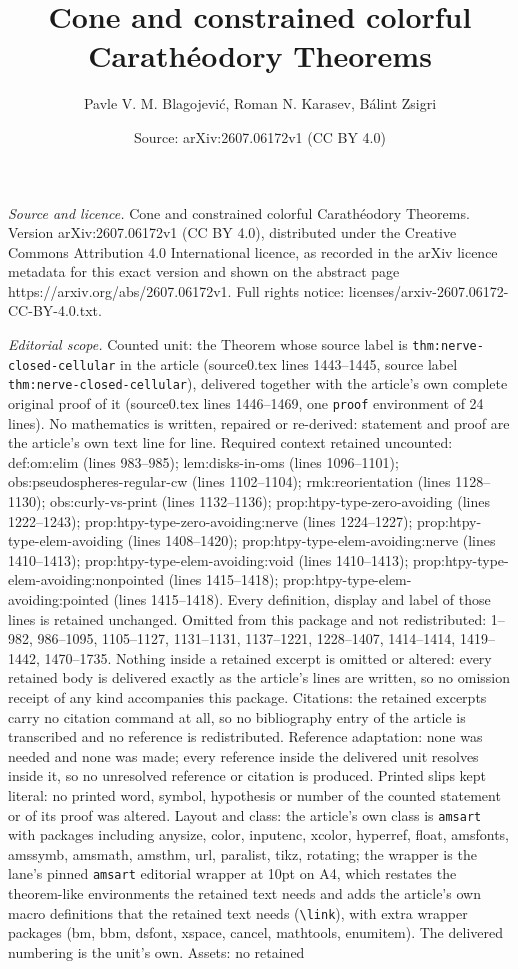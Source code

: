 \documentclass[10pt,a4paper]{amsart}
\title[Cone and constrained colorful Carath\'eodory Theorems]{Cone and constrained colorful Carath\'eodory Theorems}
\author{Pavle V. M. Blagojevi\'c, Roman N. Karasev, B\'alint Zsigri}
\date{Source: arXiv:2607.06172v1 (CC BY 4.0)}
\begin{document}
\maketitle

\noindent\emph{Source and licence.} Cone and constrained colorful Carath\'eodory Theorems. Version arXiv:2607.06172v1 (CC BY 4.0), distributed under the Creative Commons Attribution 4.0 International licence, as recorded in the arXiv licence metadata for this exact version and shown on the abstract page https://arxiv.org/abs/2607.06172v1. Full rights notice: licenses/arxiv-2607.06172-CC-BY-4.0.txt.\par\smallskip

\noindent\textit{Editorial scope.} Counted unit: the Theorem whose source label is \texttt{thm:nerve-closed-cellular} in the article (source0.tex lines 1443--1445, source label \texttt{thm:nerve-closed-cellular}), delivered together with the article's own complete original proof of it (source0.tex lines 1446--1469, one \texttt{proof} environment of 24 lines). No mathematics is written, repaired or re-derived: statement and proof are the article's own text line for line. Required context retained uncounted: def:om:elim (lines 983--985); lem:disks-in-oms (lines 1096--1101); obs:pseudospheres-regular-cw (lines 1102--1104); rmk:reorientation (lines 1128--1130); obs:curly-vs-print (lines 1132--1136); prop:htpy-type-zero-avoiding (lines 1222--1243); prop:htpy-type-zero-avoiding:nerve (lines 1224--1227); prop:htpy-type-elem-avoiding (lines 1408--1420); prop:htpy-type-elem-avoiding:nerve (lines 1410--1413); prop:htpy-type-elem-avoiding:void (lines 1410--1413); prop:htpy-type-elem-avoiding:nonpointed (lines 1415--1418); prop:htpy-type-elem-avoiding:pointed (lines 1415--1418). Every definition, display and label of those lines is retained unchanged. Omitted from this package and not redistributed: 1--982, 986--1095, 1105--1127, 1131--1131, 1137--1221, 1228--1407, 1414--1414, 1419--1442, 1470--1735. Nothing inside a retained excerpt is omitted or altered: every retained body is delivered exactly as the article's lines are written, so no omission receipt of any kind accompanies this package. Citations: the retained excerpts carry no citation command at all, so no bibliography entry of the article is transcribed and no reference is redistributed. Reference adaptation: none was needed and none was made; every reference inside the delivered unit resolves inside it, so no unresolved reference or citation is produced. Printed slips kept literal: no printed word, symbol, hypothesis or number of the counted statement or of its proof was altered. Layout and class: the article's own class is \texttt{amsart} with packages including anysize, color, inputenc, xcolor, hyperref, float, amsfonts, amssymb, amsmath, amsthm, url, paralist, tikz, rotating; the wrapper is the lane's pinned \texttt{amsart} editorial wrapper at 10pt on A4, which restates the theorem-like environments the retained text needs and adds the article's own macro definitions that the retained text needs (\texttt{\textbackslash link}), with extra wrapper packages (bm, bbm, dsfont, xspace, cancel, mathtools, enumitem). The delivered numbering is the unit's own. Assets: no retained 
\end{document}
